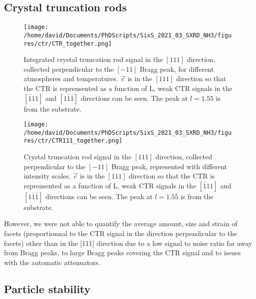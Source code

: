 \subsection{Crystal truncation rods}

\begin{figure}[!htb]
    \centering
    \texttt{[image: /home/david/Documents/PhDScripts/SixS\_2021\_03\_SXRD\_NH3/figures/ctr/CTR\_together.png]}
    \caption{
        Integrated crystal truncation rod signal in the $[111]$ direction, collected perpendicular to the $[-11]$ Bragg peak, for different atmospheres and temperatures.
        $\vec{c}$ is in the $[111]$ direction so that the CTR is reprensented as a function of L, weak CTR signals in the $[\bar{1}11]$ and $[1\bar{1}\bar{1}]$ directions can be seen.
        The peak at $l=1.55$ is from the substrate.
    }
    \label{fig:CTR111Particles}
\end{figure}

\begin{figure}[!htb]
    \centering
    \texttt{[image: /home/david/Documents/PhDScripts/SixS\_2021\_03\_SXRD\_NH3/figures/ctr/CTR111\_together.png]}
    \caption{
        Crystal truncation rod signal in the $[111]$ direction, collected perpendicular to the $[-11]$ Bragg peak, represented with different intensity scales.
        $\vec{c}$ is in the $[111]$ direction so that the CTR is reprensented as a function of L, weak CTR signals in the $[\bar{1}11]$ and $[1\bar{1}\bar{1}]$ directions can be seen.
        The peak at $l=1.55$ is from the substrate.
    }
    \label{fig:CTR111Particles}
\end{figure}



However, we were not able to quantify the average amount, size and strain of facets (proportionnal to the CTR signal in the direction perpendicular to the facets) other than in the [111] direction due to a low signal to noise ratio far away from Bragg peaks, to large Bragg peaks covering the CTR signal and to issues with the automatic attenuators.


\subsection{Particle stability}

